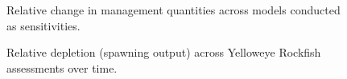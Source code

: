 \documentclass[
]{scrartcl}
\begin{document}
\clearpage

\begin{figure}


\caption{\label{fig-sens_sum}Relative change in management quantities
across models conducted as sensitivities.}

\end{figure}%

\begin{figure}


\caption{\label{fig-status_assmtns}Relative depletion (spawning output)
across Yelloweye Rockfish assessments over time.}

\end{figure}%
\end{document}
